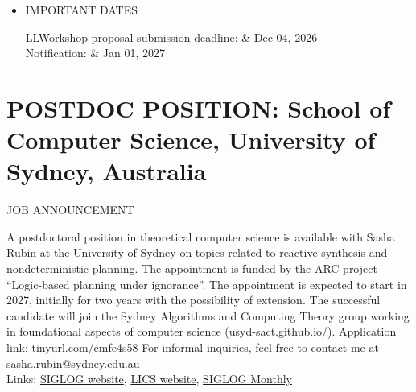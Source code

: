 \documentclass[prodmode,acmtecs]{acmsmall} %
\begin{document}
\begin{itemize}
\item  IMPORTANT DATES 
 
\begin{tabulary}{\linewidth}{LL}Workshop proposal submission deadline:  & Dec 04, 2026 \\
Notification:  & Jan 01, 2027 \\
\end{tabulary}
 
\end{itemize}\section{POSTDOC POSITION: School of Computer Science, University of Sydney, Australia}\label{POSTDOCPOSITION}JOB ANNOUNCEMENT 

  A postdoctoral position in theoretical computer science is available with Sasha Rubin at the University of Sydney on topics related to reactive synthesis and nondeterministic planning. The appointment is funded by the ARC project “Logic-based planning under ignorance”. The appointment is expected to start in 2027, initially for two years with the possibility of extension. The successful candidate will join the Sydney Algorithms and Computing Theory group working in foundational aspects of computer science (usyd-sact.github.io/). Application link: tinyurl.com/cmfe4s58 For informal inquiries, feel free to contact me at sasha.rubin@sydney.edu.au\\ 



\bigskip Links: \href{http://siglog.org/}{SIGLOG website}, \href{https://lics.siglog.org}{LICS website}, \href{https://lics.siglog.org/newsletters/}{SIGLOG Monthly}
\end{document}
